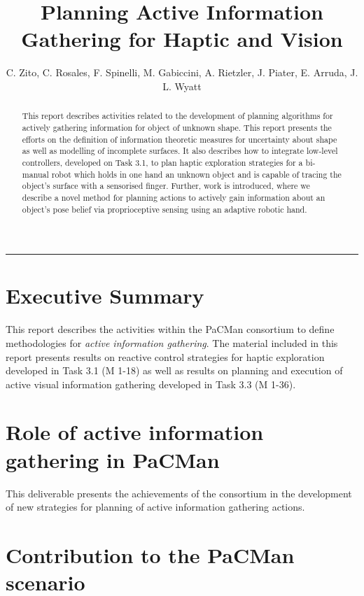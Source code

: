 \documentclass[a4paper,11pt,pdf]{../templates/pacmanreport}
\title{Planning Active Information Gathering for Haptic and Vision}
\author{C. Zito, C. Rosales, F. Spinelli, M. Gabiccini, A. Rietzler, J. Piater, E. Arruda, J. L. Wyatt}
\begin{document}
\maketitle

\begin{abstract}
\noindent 
This report describes activities related to the development of planning algorithms for actively gathering information for object of unknown shape. 
This report presents the efforts on the definition of information theoretic measures for uncertainty about shape as well as modelling of incomplete surfaces. 
It also describes how to integrate low-level controllers, developed on Task 3.1, to plan haptic exploration strategies for a bi-manual robot which holds in one 
hand an unknown object and is capable of tracing the object's surface with a sensorised finger. 
Further, work is introduced, where we describe a novel method for planning actions to actively gain 
information about an object's pose belief via proprioceptive sensing using an adaptive robotic hand.
\end{abstract}


\vspace{.2em}
\hrule

\footnotesize

\tableofcontents

\normalsize

\newpage

\section*{Executive Summary}

This report describes the activities within the PaCMan consortium to define methodologies for \emph{active information gathering}.
The material included in this report presents results on reactive control strategies for haptic exploration developed in Task 3.1 (M 1-18) 
as well as results on planning and execution of active visual information gathering developed in Task 3.3 (M 1-36).

\section*{Role of active information gathering in PaCMan}

This deliverable presents the achievements of the consortium in the development of new strategies for planning of active information gathering actions. 

\section*{Contribution to the PaCMan scenario}
\end{document}
